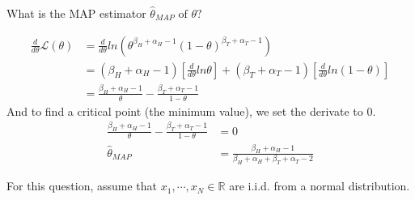 \documentclass[11pt,largemargins]{homework}
\begin{document}
\begin{alphaparts}
	\questionpart
	What is the MAP estimator $\hat{\theta}_{MAP}\text{ of }\theta?$

	\begin{align*}
		\frac{d}{d\theta}\mathcal{L}(\theta)&=\frac{d}{d\theta}ln\left( \theta^{\beta_H+\alpha_H-1}{(1-\theta)}^{\beta_T+\alpha_T-1}\right)\\
		&= (\beta_H+\alpha_H-1)\left[ \frac{d}{d\theta}ln\theta\right]+(\beta_T+\alpha_T-1)\left[ \frac{d}{d\theta}ln(1-\theta)\right]\\
		&= \frac{\beta_H+\alpha_H-1}{\theta}-\frac{\beta_T+\alpha_T-1}{1-\theta}
	\end{align*}
	And to find a critical point (the minimum value), we set the derivate to 0.
	\begin{align*}
		\frac{\beta_H+\alpha_H-1}{\theta}-\frac{\beta_T+\alpha_T-1}{1-\theta}&=0\\
		\hat{\theta}_{MAP}&=\frac{\beta_H+\alpha_H-1}{\beta_H+\alpha_H+\beta_T+\alpha_T-2}
	\end{align*}
\end{alphaparts}
\question For this question, assume that $x_1, \cdots, x_N\in\mathbb{R}$ are i.i.d. from a normal distribution.
\end{document}
